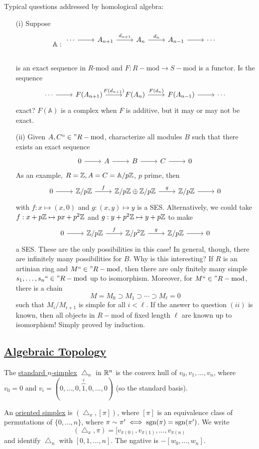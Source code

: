 \documentclass[x11names,reqno,14pt]{extarticle}
\newcommand{\A}{\mathbb{A}}
\newcommand{\fin}{``\in"}
\newcommand{\Rmod}{R-\text{mod}}
\begin{document}
Typical questions addressed by homological algebra: 

\begin{itemize}
\item[(i)] Suppose
\[\A:
\begin{tikzcd}
\cdots\ar[r]&A_{n + 1}\ar[r, "d_{n + 1}"]&A_n\ar[r,"d_n"]&A_{n - 1}\ar[r]&\cdots \\
\end{tikzcd}
\]
is an exact sequence in $R$-mod and $F:\Rmod\to S-\text{mod}$ is a functor. Is the sequence
\[
\begin{tikzcd}
\cdots\ar[r]&F(A_{n + 1})\ar[r, "F(d_{n + 1})"] &F(A_n)\ar[r,"F(d_n)"] &F(A_{n - 1})\ar[r] &\cdots
\end{tikzcd}
\]
exact? $F(\A)$ is a complex when $F$ is additive, but it may or may not be exact. 

\item[(ii)] Given $A, C\fin \Rmod$, characterize all modules $B$ such that there exists an exact sequence
\[
\exactshort{A}{}{B}{}{C}
\]
As an example, $R =\Z, A = C = \A/p\Z$, $p$ prime, then
\[
\exactshort{\Z/p\Z}{f}{\Z/p\Z\oplus\Z/p\Z}{g}{\Z/p\Z}
\]
with $f:x\mapsto(x,0)$ and $g:(x,y)\mapsto y$ is a SES. Alternatively, we could take $f:x + p\mathbb{Z}\mapsto px + p^2\mathbb{Z}$ and $g:y + p^2\mathbb{Z}\mapsto y + p\mathbb{Z}$ to make 
\[
\exactshort{\Z/p\Z}{f}{\Z/p^2\Z}{g}{\Z/p\Z}
\]
a SES. These are the only possibilities in this case! In general, though, there are infinitely many possibilities for $B$. Why is this interesting? If $R$ is an artinian ring and $M\fin\Rmod$, then there are only finitely many simple $s_1,\dots,s_n\fin\Rmod$ up to isomorphism. Moreover, for $M\fin\Rmod$, there is a chain
\[
M = M_0\supset M_1 \supset \cdots \supset M_{\ell} = 0
\]
such that $M_i/M_{i + 1}$ is simple for all $i<\ell$. If the answer to question $(ii)$ is known, then all objects in $\Rmod$ of fixed length $\ell$ are known up to isomorphism! Simply proved by induction.
\end{itemize}

\subsection*{\underline{Algebraic Topology}}

The \underline{standard $n$-simplex} $\bigtriangleup_n$ in $\mathbb{R}^n$ is the convex hull of $v_0, v_1, \dots, v_n$, where $v_0 = 0$ and $v_i = (0, \dots, 0, \overbrace{1}^{i}, 0, \dots, 0)$ (so the standard basis). 

An \underline{oriented simplex} is $(\bigtriangleup_x, [\pi])$, where $[\pi]$ is an equivalence class of permutations of $\{0, \dots, n\}$, where $\pi\sim\pi'\iff \operatorname{sgn}(\pi)=\operatorname{sgn}(\pi')$. We write
\[
(\bigtriangleup_x, \pi) = [v_{\pi(0)}, v_{\pi(1)},\dots,v_{\pi(n)}
\]
and identify $\bigtriangleup_n$ with $[0, 1, \dots, n]$. The ngative is $-[w_0, \dots, w_n]$. 
\end{document}
